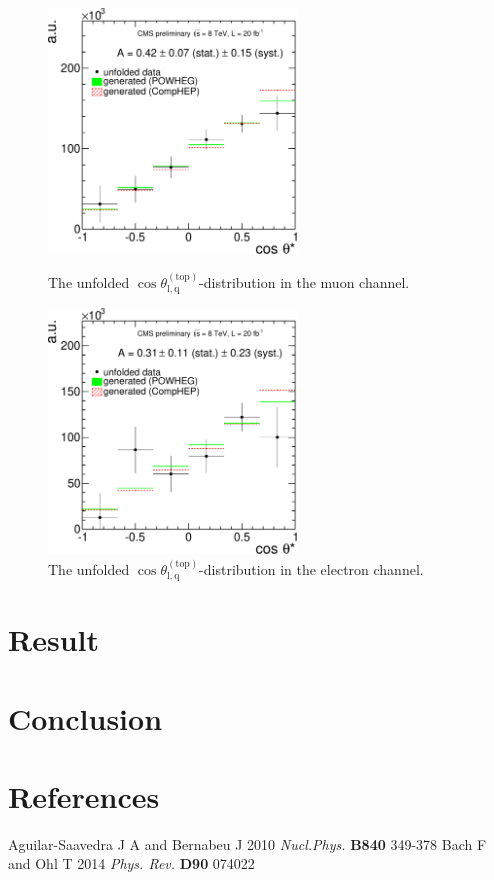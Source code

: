 \documentclass[a4paper]{jpconf}
\newcommand{\costheta}[0]{\cos\theta_{\mathrm{l,q}}^{\mathrm{(top)}}}
\begin{document}
\begin{figure}[h]
\begin{center}
\begin{minipage}{7cm}
\includegraphics[height=6.5cm]{costheta_unfolded_mu-crop}
\caption{\label{fig:unfolded_mu}The unfolded $\costheta$-distribution in the muon channel.}
\end{minipage}\hspace{1cm}%
\begin{minipage}{7cm}
\includegraphics[height=6.5cm]{costheta_unfolded_el-crop}
\caption{\label{fig:unfolded_el}The unfolded $\costheta$-distribution in the electron channel.}
\end{minipage} 
\end{center}
\end{figure}

\section{Result}
\section{Conclusion}



\section*{References}
\begin{thebibliography}{9}
 Aguilar-Saavedra J A and Bernabeu J 2010 {\it Nucl.Phys.} {\bf B840} 349-378 
 Bach F and Ohl T 2014 {\it Phys. Rev.} {\bf D90} 074022 



\end{thebibliography}
\end{document}
